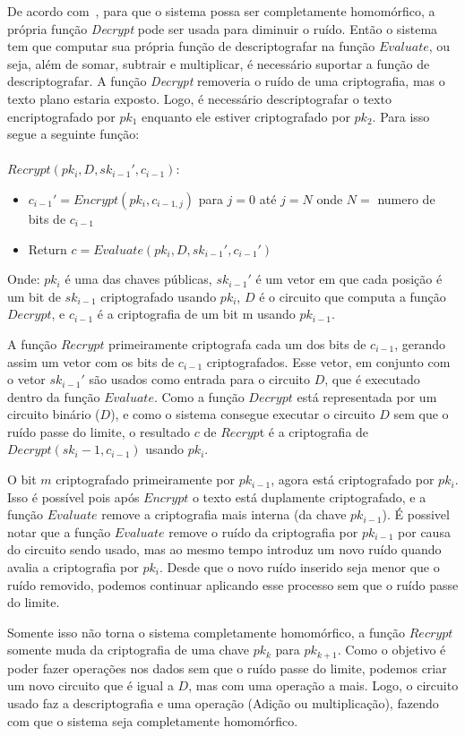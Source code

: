 De acordo com~\cite{easyfhe}, para que o sistema possa ser completamente homomórfico, a própria função \textit{Decrypt} pode ser usada para diminuir o ruído.
Então o sistema tem que computar sua própria função de descriptografar na função $Evaluate$, ou seja, além de somar, subtrair e multiplicar, é necessário suportar a função de descriptografar.
A função \textit{Decrypt} removeria o ruído de uma criptografia, mas o texto plano estaria exposto. Logo, é necessário descriptografar o texto encriptografado por $pk_1$ enquanto ele estiver criptografado por $pk_2$. Para isso segue a seguinte função:
\\\\
$Recrypt(pk_i , D, sk_{i-1}', c_{i-1})$:
\begin{itemize}
	\item $c_{i-1}' = Encrypt(pk_i, c_{i-1,j})$ para $j = 0$ até $j = N$ onde $N =$ numero de bits de $c_{i-1}$
	\item Return $c = Evaluate(pk_i, D, sk_{i-1}', c_{i-1}')$
\end{itemize}
Onde: $pk_i$ é uma das chaves públicas, $sk_{i-1}'$ é um vetor em que cada posição é um bit de $sk_{i-1}$ criptografado usando $pk_i$, $D$ é o circuito que computa a função $Decrypt$, e $c_{i-1}$ é a criptografia de um bit m usando $pk_{i-1}$.
  
A função $Recrypt$ primeiramente criptografa cada um dos bits de $c_{i-1}$, gerando assim um vetor com os bits de $c_{i-1}$ criptografados.
Esse vetor, em conjunto com o vetor $sk_{i-1}'$ são usados como entrada para o circuito $D$, que é executado dentro da função $Evaluate$.
Como a função $Decrypt$ está representada por um circuito binário ($D$), e como o sistema consegue executar o circuito $D$ sem que o ruído passe do limite, o resultado $c$ de $Recryp$t é a criptografia de $Decrypt(sk_i-1, c_{i-1})$ usando $pk_i$.
  
O bit $m$ criptografado primeiramente por $pk_{i-1}$, agora está criptografado por $pk_{i}$.
Isso é possível pois após $Encrypt$ o texto está duplamente criptografado, e a função $Evaluate$ remove a criptografia mais interna (da chave $pk_{i-1}$).
É possivel notar que a função $Evaluate$ remove o ruído da criptografia por $pk_{i-1}$ por causa do circuito sendo usado, mas ao mesmo tempo introduz um novo ruído quando avalia a criptografia por $pk_i$.
Desde que o novo ruído inserido seja menor que o ruído removido, podemos continuar aplicando esse processo sem que o ruído passe do limite.
  
Somente isso não torna o sistema completamente homomórfico, a função $Recrypt$ somente muda da criptografia de uma chave $pk_k$ para $pk_{k+1}$.
Como o objetivo é poder fazer operações nos dados sem que o ruído passe do limite, podemos criar um novo circuito que é igual a $D$, mas com uma operação a mais.
Logo, o circuito usado faz a descriptografia e uma operação (Adição ou multiplicação), fazendo com que o sistema seja completamente homomórfico.
  
